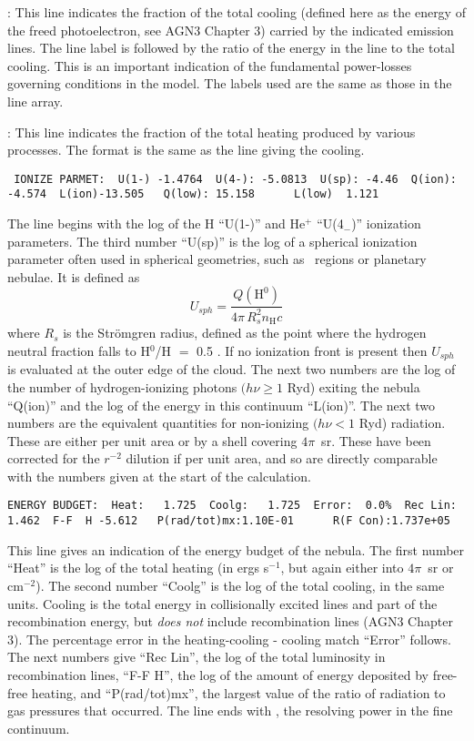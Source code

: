 :  This line indicates the fraction of the total cooling (defined
here as the energy of the freed photoelectron, see AGN3 Chapter 3) carried
by the indicated emission lines.
The line label is followed by the ratio
of the energy in the line to the total cooling.
This is an important
indication of the fundamental power-losses governing conditions in the model.
The labels used are the same as those in the line array.

:  This line indicates the fraction of the total heating produced
by various processes.  The format is the same as the line giving the cooling.
{\setverbatimfontsize{\tiny}
\begin{verbatim}
 IONIZE PARMET:  U(1-) -1.4764  U(4-): -5.0813  U(sp): -4.46  Q(ion):   -4.574  L(ion)-13.505   Q(low): 15.158      L(low)  1.121
\end{verbatim}
}

The line begins with the log of the H ``U(1-)'' and He$^+$ ``U(4$_-$)''
ionization parameters.
The third number ``U(sp)'' is the log of a spherical
ionization parameter often used in spherical geometries,
such as \hii\ regions or planetary nebulae.
It is defined as
\begin{equation}
{U_{sph}} = \frac{{Q\left( {{{\mathrm{H}}^{\mathrm{0}}}} \right)}}{{4\pi
\,R_s^2{n_{\mathrm{H}}}c}}%
\end{equation}
where $R_s$ is the Str\"omgren radius,
defined as the point where the hydrogen
neutral fraction falls to H$^0$/H $=$ 0.5 .
If no ionization front is present
then $U_{sph}$ is evaluated at the outer edge of the cloud.
The next two numbers
are the log of the number of hydrogen-ionizing photons
$(h\nu \ge 1$ Ryd) exiting
the nebula ``Q(ion)'' and the log of the energy
in this continuum ``L(ion)''.
The next two numbers are the equivalent quantities for
non-ionizing $(h\nu < 1$ Ryd) radiation.
These are either per unit area or by a shell covering
$4\pi$~sr.
These have been corrected for the $r^{-2}$ dilution if per unit area,
and so are directly comparable with the numbers given at the start of the
calculation.
{\setverbatimfontsize{\tiny}
\begin{verbatim}
ENERGY BUDGET:  Heat:   1.725  Coolg:   1.725  Error:  0.0%  Rec Lin:   1.462  F-F  H -5.612   P(rad/tot)mx:1.10E-01      R(F Con):1.737e+05
\end{verbatim}
}

This line gives an indication of the energy budget of the nebula.
The
first number ``Heat'' is the log of the total heating (in ergs s$^{-1}$, but
again either into $4\pi$~sr or cm$^{-2}$).
The second number ``Coolg'' is the log
of the total cooling, in the same units.
Cooling is the total energy in
collisionally excited lines and part of the recombination energy,
but \emph{does not} include recombination lines (AGN3 Chapter 3).
The percentage error
in the heating-cooling - cooling match ``Error'' follows.
The next numbers
give ``Rec Lin'', the log of the total luminosity in recombination lines,
``F-F  H'', the log of the amount of energy deposited by
free-free heating,
and ``P(rad/tot)mx'', the largest value of the ratio of
radiation to gas pressures that occurred.
The line ends with , the resolving power in the fine continuum.

